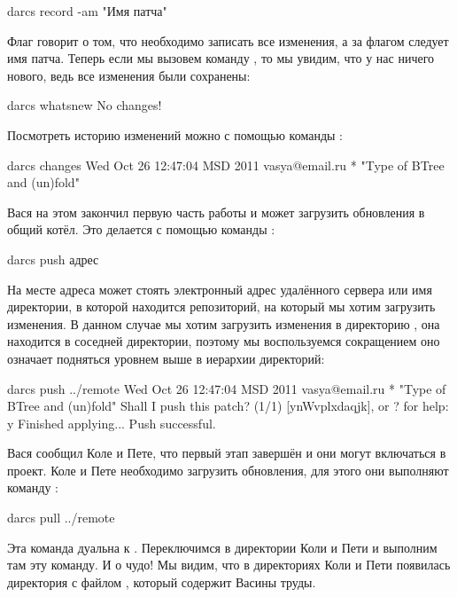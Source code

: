\begin{code}
darcs record -am "Имя патча"
\end{code}

Флаг  говорит о том, что необходимо записать все изменения,
а за флагом  следует имя патча. Теперь если мы вызовем
команду , то мы увидим, что у нас ничего нового, ведь
все изменения были сохранены:

\begin{code}
darcs whatsnew
No changes!
\end{code}

Посмотреть историю изменений можно с помощью команды :

\begin{code}
darcs changes
Wed Oct 26 12:47:04 MSD 2011  vasya@email.ru
  * "Type of BTree and (un)fold"
\end{code}


Вася на этом закончил первую часть работы и может
загрузить обновления в общий котёл. Это делается с помощью
команды :

\begin{code}
darcs push адрес
\end{code}

На месте адреса может стоять электронный адрес удалённого сервера
или имя директории, в которой находится репозиторий, на
который мы хотим загрузить изменения. В данном случае мы хотим
загрузить изменения в директорию , она находится
в соседней директории, поэтому мы воспользуемся сокращением
 оно означает подняться уровнем выше в иерархии директорий:

\begin{code}
darcs push ../remote
Wed Oct 26 12:47:04 MSD 2011  vasya@email.ru
  * "Type of BTree and (un)fold"
Shall I push this patch? (1/1)  [ynWvplxdaqjk], or ? for help: y
Finished applying...
Push successful.
\end{code}

Вася сообщил Коле и Пете, что первый этап завершён 
и они могут включаться в проект. Коле и Пете
необходимо загрузить обновления, для этого они 
выполняют команду :

\begin{code}
darcs pull ../remote
\end{code}

Эта команда дуальна к . Переключимся в директории
Коли и Пети и выполним там эту команду.
И о чудо! Мы видим, что в директориях Коли и Пети появилась
директория  с файлом , который содержит
Васины труды.

